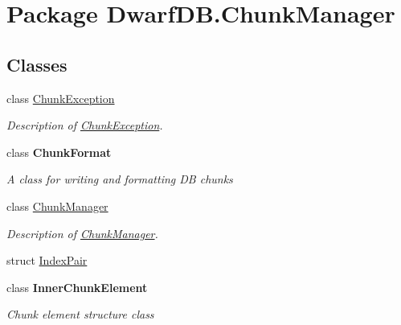 \hypertarget{namespace_dwarf_d_b_1_1_chunk_manager}{\section{Package Dwarf\+D\+B.\+Chunk\+Manager}
\label{namespace_dwarf_d_b_1_1_chunk_manager}
}
\subsection*{Classes}
\begin{DoxyCompactItemize}
\item 
class \hyperlink{class_dwarf_d_b_1_1_chunk_manager_1_1_chunk_exception}{Chunk\+Exception}
\begin{DoxyCompactList}\small\item\em Description of \hyperlink{class_dwarf_d_b_1_1_chunk_manager_1_1_chunk_exception}{Chunk\+Exception}. \end{DoxyCompactList}\item 
class {\bfseries Chunk\+Format}
\begin{DoxyCompactList}\small\item\em A class for writing and formatting D\+B chunks \end{DoxyCompactList}\item 
class \hyperlink{class_dwarf_d_b_1_1_chunk_manager_1_1_chunk_manager}{Chunk\+Manager}
\begin{DoxyCompactList}\small\item\em Description of \hyperlink{class_dwarf_d_b_1_1_chunk_manager_1_1_chunk_manager}{Chunk\+Manager}. \end{DoxyCompactList}\item 
struct \hyperlink{struct_dwarf_d_b_1_1_chunk_manager_1_1_index_pair}{Index\+Pair}
\item 
class {\bfseries Inner\+Chunk\+Element}
\begin{DoxyCompactList}\small\item\em Chunk element structure class \end{DoxyCompactList}\end{DoxyCompactItemize}

